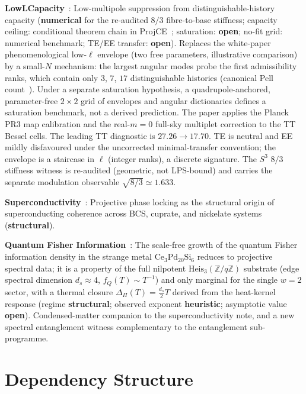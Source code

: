 \documentclass[11pt,a4paper]{article}
\newcommand{\sstruct}{\textcolor{cstruct}{\textbf{structural}}}
\newcommand{\sheur}{\textcolor{cheur}{\textbf{heuristic}}}
\newcommand{\sopen}{\textcolor{copen}{\textbf{open}}}
\newcommand{\snum}{\textcolor{cnum}{\textbf{numerical}}}
\begin{document}
    \textbf{LowLCapacity}~\cite{Beau2026dhc}: Low-multipole suppression from distinguishable-history capacity
    (\snum{} for the re-audited $8/3$ fibre-to-base stiffness; capacity ceiling: conditional theorem chain
    in ProjCE~\cite{Beau2026pce}; saturation: \sopen; no-fit grid: numerical benchmark; TE/EE transfer:
    \sopen).
    Replaces the white-paper phenomenological low-$\ell$ envelope (two free parameters, illustrative
    comparison) by a small-$N$ mechanism: the largest angular modes probe the first admissibility ranks, which
    contain only $3$, $7$, $17$ distinguishable histories (canonical Pell count~\cite{Beau2026tb}).
    Under a separate saturation hypothesis, a quadrupole-anchored, parameter-free $2\times2$ grid of envelopes
    and angular dictionaries defines a saturation benchmark, not a derived prediction.
    The paper applies the Planck PR3 map calibration and the real-$m=0$ full-sky multiplet correction to the
    TT Bessel cells.
    The leading TT diagnostic is $27.26\to17.70$.
    TE is neutral and EE mildly disfavoured under the uncorrected minimal-transfer convention; the envelope is
    a staircase in $\ell$ (integer ranks), a discrete signature.
    The $S^3$ $8/3$ stiffness witness is re-audited (geometric, not LPS-bound) and carries the separate
    modulation observable $\sqrt{8/3}\simeq1.633$.

    \textbf{Superconductivity}~\cite{Beau2026g}: Projective phase locking as the structural origin of
    superconducting coherence across BCS, cuprate, and nickelate systems (\sstruct).

    \textbf{Quantum Fisher Information}~\cite{Beau2026qfi}: The scale-free growth of the quantum Fisher information
    density in the strange metal $\mathrm{Ce}_3\mathrm{Pd}_{20}\mathrm{Si}_6$ reduces to projective spectral data;
    it is a property of the full nilpotent $\mathrm{Heis}_3(\mathbb{Z}/q\mathbb{Z})$ substrate (edge spectral
    dimension $d_s\approx 4$, $f_Q(T)\sim T^{-1}$) and only marginal for the single $w=2$ sector, with a thermal
    closure $\Delta_\Pi(T)=\tfrac{d_s}{2}T$ derived from the heat-kernel response (regime \sstruct; observed
    exponent \sheur; asymptotic value \sopen). Condensed-matter companion to the superconductivity note, and a new
    spectral entanglement witness complementary to the entanglement sub-programme.

  \section{Dependency Structure}
  \label{sec:graph}
\end{document}
